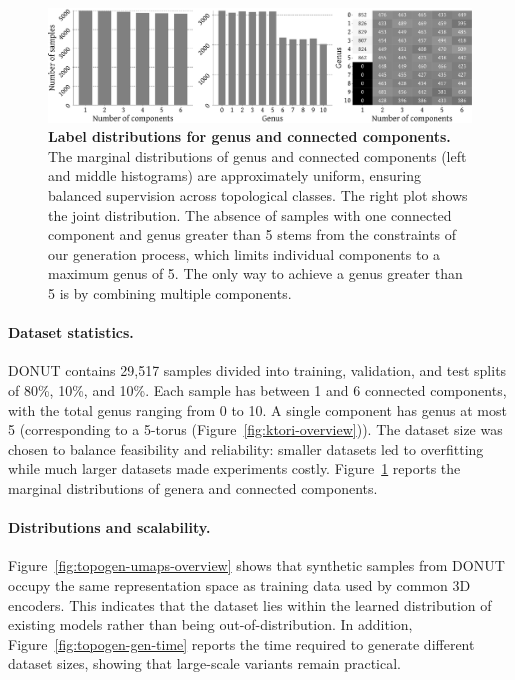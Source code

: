 \begin{figure}[h]
  \centering
  \includegraphics[width=\linewidth]{figs/topogen/label_distribution.pdf}
  \caption{\textbf{Label distributions for genus and connected components.} The marginal distributions of genus and connected components (left and middle histograms) are approximately uniform, ensuring balanced supervision across topological classes. The right plot shows the joint distribution. The absence of samples with one connected component and genus greater than 5 stems from the constraints of our generation process, which limits individual components to a maximum genus of 5. The only way to achieve a genus greater than 5 is by combining multiple components.}
  \label{fig:topogen-properties}
\end{figure}


\paragraph{Dataset statistics.}
DONUT contains 29,517 samples divided into training, validation, and test splits of 80\%, 10\%, and 10\%. Each sample has between 1 and 6 connected components, with the total genus ranging from 0 to 10. A single component has genus at most 5 (corresponding to a 5-torus (Figure~\ref{fig:ktori-overview})). The dataset size was chosen to balance feasibility and reliability: smaller datasets led to overfitting while much larger datasets made experiments costly. Figure~\ref{fig:topogen-properties} reports the marginal distributions of genera and connected components.

\paragraph{Distributions and scalability.}
Figure~\ref{fig:topogen-umaps-overview} shows that synthetic samples from DONUT occupy the same representation space as training data used by common 3D encoders. This indicates that the dataset lies within the learned distribution of existing models rather than being out-of-distribution. In addition, Figure~\ref{fig:topogen-gen-time} reports the time required to generate different dataset sizes, showing that large-scale variants remain practical.


